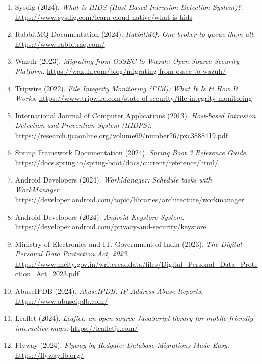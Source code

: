 \documentclass[12pt,a4paper]{report}
\begin{document}
\begin{enumerate}[leftmargin=*, noitemsep]
  \item Sysdig (2024). \textit{What is HIDS (Host-Based Intrusion Detection System)?}. \url{https://www.sysdig.com/learn-cloud-native/what-is-hids}

  \item RabbitMQ Documentation (2024). \textit{RabbitMQ: One broker to queue them all}. \url{https://www.rabbitmq.com/}

  \item Wazuh (2023). \textit{Migrating from OSSEC to Wazuh: Open Source Security Platform}. \url{https://wazuh.com/blog/migrating-from-ossec-to-wazuh/}

  \item Tripwire (2022). \textit{File Integrity Monitoring (FIM): What It Is \& How It Works}. \url{https://www.tripwire.com/state-of-security/file-integrity-monitoring}

  \item International Journal of Computer Applications (2013). \textit{Host-based Intrusion Detection and Prevention System (HIDPS)}. \url{https://research.ijcaonline.org/volume69/number26/pxc3888419.pdf}

  \item Spring Framework Documentation (2024). \textit{Spring Boot 3 Reference Guide}. \url{https://docs.spring.io/spring-boot/docs/current/reference/html/}

  \item Android Developers (2024). \textit{WorkManager: Schedule tasks with WorkManager}. \url{https://developer.android.com/topic/libraries/architecture/workmanager}

  \item Android Developers (2024). \textit{Android Keystore System}. \url{https://developer.android.com/privacy-and-security/keystore}

  \item Ministry of Electronics and IT, Government of India (2023). \textit{The Digital Personal Data Protection Act, 2023}. \url{https://www.meity.gov.in/writereaddata/files/Digital_Personal_Data_Protection_Act_2023.pdf}

  \item AbuseIPDB (2024). \textit{AbuseIPDB: IP Address Abuse Reports}. \url{https://www.abuseipdb.com/}

  \item Leaflet (2024). \textit{Leaflet: an open-source JavaScript library for mobile-friendly interactive maps}. \url{https://leafletjs.com/}

  \item Flyway (2024). \textit{Flyway by Redgate: Database Migrations Made Easy}. \url{https://flywaydb.org/}
\end{enumerate}
\end{document}
